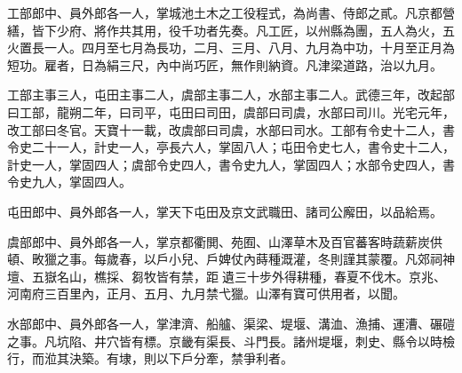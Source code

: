 \begin{pinyinscope}
 工部郎中、員外郎各一人，掌城池土木之工役程式，為尚書、侍郎之貳。凡京都營繕，皆下少府、將作共其用，役千功者先奏。凡工匠，以州縣為團，五人為火，五火置長一人。四月至七月為長功，二月、三月、八月、九月為中功，十月至正月為短功。雇者，日為絹三尺，內中尚巧匠，無作則納資。凡津梁道路，治以九月。



 工部主事三人，屯田主事二人，虞部主事二人，水部主事二人。武德三年，改起部曰工部，龍朔二年，曰司平，屯田曰司田，虞部曰司虞，水部曰司川。光宅元年，改工部曰冬官。天寶十一載，改虞部曰司虞，水部曰司水。工部有令史十二人，書令史二十一人，計史一人，亭長六人，掌固八人；屯田令史七人，書令史十二人，計史一人，掌固四人；虞部令史四人，書令史九人，掌固四人；水部令史四人，書令史九人，掌固四人。



 屯田郎中、員外郎各一人，掌天下屯田及京文武職田、諸司公廨田，以品給焉。



 虞部郎中、員外郎各一人，掌京都衢閧、苑囿、山澤草木及百官蕃客時蔬薪炭供頓、畋獵之事。每歲春，以戶小兒、戶婢仗內蒔種溉灌，冬則謹其蒙覆。凡郊祠神壇、五嶽名山，樵採、芻牧皆有禁，距遺三十步外得耕種，春夏不伐木。京兆、河南府三百里內，正月、五月、九月禁弋獵。山澤有寶可供用者，以聞。



 水部郎中、員外郎各一人，掌津濟、船艫、渠梁、堤堰、溝洫、漁捕、運漕、碾磑之事。凡坑陷、井穴皆有標。京畿有渠長、斗門長。諸州堤堰，刺史、縣令以時檢行，而涖其決築。有埭，則以下戶分牽，禁爭利者。



\end{pinyinscope}